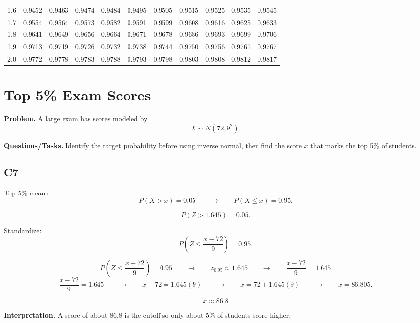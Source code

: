 \begin{center}
\begin{tabular}{c|cccccccccc}
			1.6 & 0.9452 & 0.9463 & 0.9474 & 0.9484 & 0.9495 & 0.9505 & 0.9515 & 0.9525 & 0.9535 & 0.9545 \\
			1.7 & 0.9554 & 0.9564 & 0.9573 & 0.9582 & 0.9591 & 0.9599 & 0.9608 & 0.9616 & 0.9625 & 0.9633 \\
			1.8 & 0.9641 & 0.9649 & 0.9656 & 0.9664 & 0.9671 & 0.9678 & 0.9686 & 0.9693 & 0.9699 & 0.9706 \\
			1.9 & 0.9713 & 0.9719 & 0.9726 & 0.9732 & 0.9738 & 0.9744 & 0.9750 & 0.9756 & 0.9761 & 0.9767 \\
			2.0 & 0.9772 & 0.9778 & 0.9783 & 0.9788 & 0.9793 & 0.9798 & 0.9803 & 0.9808 & 0.9812 & 0.9817 \\
			\bottomrule
		\end{tabular}
	\end{center}
	
	
	\section{Top 5\% Exam Scores}
	
	\textbf{Problem.} A large exam has scores modeled by
	\[
	X \sim N(72, 9^2).
	\]
	
	\textbf{Questions/Tasks.} Identify the target probability before using inverse normal, then find the score $x$ that marks the top 5\% of students.
	
	\subsection*{C7}
	
	Top 5\% means
	\[
	P(X > x) = 0.05
	\qquad \longrightarrow \qquad
	P(X \leq x) = 0.95.
	\]
	
	\[
	P(Z>1.645)=0.05.
	\]
	
	
	Standardize:
	\[
	P\left(Z \leq \frac{x - 72}{9}\right) = 0.95.
	\]
	
	\[
	P\left(Z \leq \frac{x - 72}{9}\right)=0.95
	\qquad \longrightarrow \qquad
	z_{0.95}\approx 1.645
	\qquad \longrightarrow \qquad
	\frac{x - 72}{9}=1.645
	\]
	\[
	\frac{x - 72}{9}=1.645
	\qquad \longrightarrow \qquad
	x-72=1.645(9)
	\qquad \longrightarrow \qquad
	x=72+1.645(9)
	\qquad \longrightarrow \qquad
	x=86.805.
	\]
	
	\[
	x \approx 86.8
	\]
	
	\textbf{Interpretation.} A score of about 86.8 is the cutoff so only about 5\% of students score higher.
	
